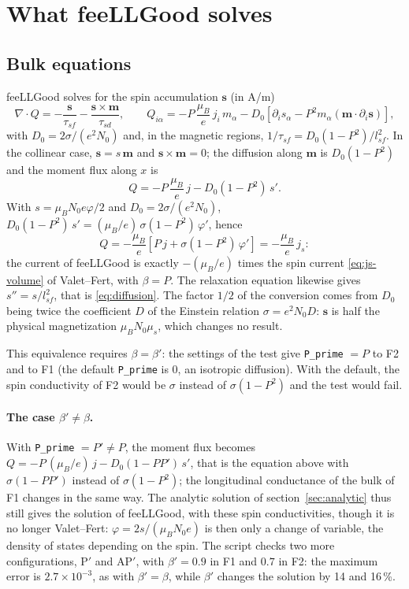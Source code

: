 \documentclass[11pt,a4paper]{article}
\newcommand{\vm}{\bm{m}}
\newcommand{\vs}{\bm{s}}
\begin{document}
\section{What feeLLGood solves}

\subsection{Bulk equations}
\label{sec:conversion}

feeLLGood solves for the spin accumulation $\vs$ (in A/m)
\begin{equation}
  \nabla\cdot Q = -\frac{\vs}{\tau_{sf}} - \frac{\vs\times\vm}{\tau_{sd}},
  \qquad
  Q_{i\alpha} = -P\,\frac{\mu_B}{e}\,j_i\,m_\alpha
  - D_0\left[\partial_i s_\alpha - P^2 m_\alpha(\vm\cdot\partial_i\vs)\right],
\end{equation}
with $D_0 = 2\sigma/(e^2N_0)$ and, in the magnetic regions,
$1/\tau_{sf} = D_0(1-P^2)/l_{sf}^2$. In the collinear case,
$\vs = s\,\vm$ and $\vs\times\vm = 0$; the diffusion along $\vm$ is
$D_0(1-P^2)$ and the moment flux along $x$ is
\begin{equation}
  Q = -P\,\frac{\mu_B}{e}\,j - D_0(1-P^2)\,s' .
\end{equation}
With $s = \mu_BN_0e\varphi/2$ and $D_0 = 2\sigma/(e^2N_0)$,
$D_0(1-P^2)\,s' = (\mu_B/e)\,\sigma(1-P^2)\,\varphi'$, hence
\begin{equation}
  Q = -\frac{\mu_B}{e}\left[P\,j + \sigma(1-P^2)\,\varphi'\right]
    = -\frac{\mu_B}{e}\,j_s :
\end{equation}
the current of feeLLGood is exactly $-(\mu_B/e)$ times the spin current
\eqref{eq:js-volume} of Valet--Fert, with $\beta = P$. The relaxation
equation likewise gives $s'' = s/l_{sf}^2$, that is \eqref{eq:diffusion}.
The factor $1/2$ of the conversion comes from $D_0$ being twice the
coefficient $D$ of the Einstein relation $\sigma = e^2N_0D$: $\vs$ is half
the physical magnetization $\mu_BN_0\mu_s$, which changes no result.

This equivalence requires $\beta=\beta'$: the settings of the test give
\texttt{P\_prime} $=P$ to F2 and to F1 (the default \texttt{P\_prime}
is 0, an isotropic diffusion). With the default, the spin conductivity of
F2 would be $\sigma$ instead of $\sigma(1-P^2)$ and the test would fail.

\paragraph{The case $\beta'\neq\beta$.} With \texttt{P\_prime} $=P'\neq P$,
the moment flux becomes $Q = -P\,(\mu_B/e)\,j - D_0(1-PP')\,s'$, that is
the equation above with $\sigma(1-PP')$ instead of $\sigma(1-P^2)$; the
longitudinal conductance of the bulk of F1 changes in the same way. The
analytic solution of section~\ref{sec:analytic} thus still gives the solution of feeLLGood,
with these spin conductivities, though it is no longer Valet--Fert:
$\varphi = 2s/(\mu_BN_0e)$ is then only a change of variable, the density
of states depending on the spin. The script checks two more configurations,
P$'$ and AP$'$, with $\beta' = 0.9$ in F1 and $0.7$ in F2: the maximum error
is $2.7\times10^{-3}$, as with $\beta'=\beta$, while $\beta'$ changes the
solution by 14 and 16\,\%.
\end{document}
